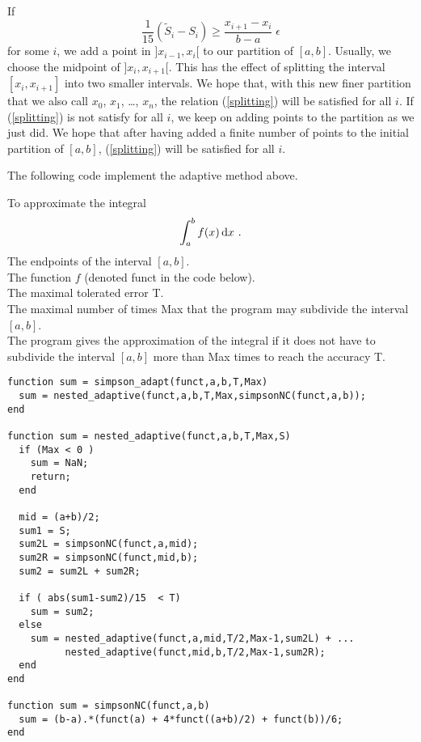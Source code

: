 If
\[
\frac{1}{15}\left( \tilde{S}_i-S_i \right) \geq
\frac{x_{i+1}-x_i}{b-a} \; \epsilon
\]
for some $i$, we add a point in $]x_{i-1},x_i[$ to our partition of
$[a,b]$.  Usually, we choose the midpoint of $]x_i,x_{i+1}[$.  This
has the effect of splitting the interval $[x_i,x_{i+1}]$ into two
smaller intervals.  We hope that, with this new finer partition that
we also call $x_0$, $x_1$, \ldots, $x_n$, the relation
(\ref{splitting}) will be satisfied for all $i$.
If (\ref{splitting}) is not satisfy for all $i$, we keep on adding
points to the partition as we just did.  We hope that after having
added a finite number of points to the initial partition of $[a,b]$,
(\ref{splitting}) will be satisfied for all $i$.

The following code implement the adaptive method above.

\begin{code}
To approximate the integral
\[
\int_a^b f(x) \,\mathrm{d}x \ .
\]
 The endpoints of the interval $[a,b]$.\\
The function $f$ (denoted  funct  in the code below).\\
The maximal tolerated error  T.\\
The maximal number of times  Max  that the program may subdivide the
interval $[a,b]$.\\
 The program gives the approximation of the
integral if it does not have to subdivide the interval $[a,b]$ more
than  Max  times to reach the accuracy  T.
\small
\begin{verbatim}
function sum = simpson_adapt(funct,a,b,T,Max)
  sum = nested_adaptive(funct,a,b,T,Max,simpsonNC(funct,a,b));
end

function sum = nested_adaptive(funct,a,b,T,Max,S)
  if (Max < 0 )
    sum = NaN;
    return;
  end

  mid = (a+b)/2;
  sum1 = S;
  sum2L = simpsonNC(funct,a,mid);
  sum2R = simpsonNC(funct,mid,b);
  sum2 = sum2L + sum2R;
 
  if ( abs(sum1-sum2)/15  < T)
    sum = sum2;
  else
    sum = nested_adaptive(funct,a,mid,T/2,Max-1,sum2L) + ...
          nested_adaptive(funct,mid,b,T/2,Max-1,sum2R);
  end
end

function sum = simpsonNC(funct,a,b)
  sum = (b-a).*(funct(a) + 4*funct((a+b)/2) + funct(b))/6;
end
\end{verbatim}
\end{code}

